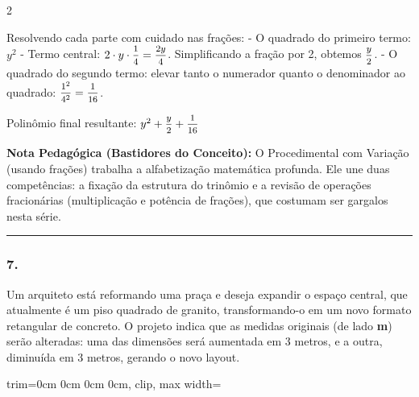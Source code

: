 \begin{multicols*}{2}
\begin{tcolorbox}[colback=CorTitUm!5, colframe=CorTitUm, boxrule=1pt, arc=4pt, left=6pt, right=6pt, top=6pt, bottom=6pt]
    Resolvendo cada parte com cuidado nas frações:
    - O quadrado do primeiro termo: $ y^2 $
    - Termo central: $ 2 \cdot y \cdot \mfrac{1}{4} = \mfrac{2y}{4} $. Simplificando a fração por 2, obtemos $ \mfrac{y}{2} $.
    - O quadrado do segundo termo: elevar tanto o numerador quanto o denominador ao quadrado: $ \mfrac{1^2}{4^2} = \mfrac{1}{16} $.
    
    Polinômio final resultante:
    $ y^2 + \mfrac{y}{2} + \mfrac{1}{16} $
    \end{tcolorbox}
    \vspace{0.15cm}
    
    \begin{boxexplicacao}
    \textbf{Nota Pedagógica (Bastidores do Conceito):} O Procedimental com Variação (usando frações) trabalha a alfabetização matemática profunda. Ele une duas competências: a fixação da estrutura do trinômio e a revisão de operações fracionárias (multiplicação e potência de frações), que costumam ser gargalos nesta série.
    \end{boxexplicacao}
\fi

\par\vspace{\espacoQuestao}

\noindent\textcolor{CorLinha}{\rule{\linewidth}{0.5pt}} 
\par\vspace{\espacoPreQuestao}
\subsubsection*{7.} 
\begin{enunciadoLiteral}
Um arquiteto está reformando uma praça e deseja expandir o espaço central, que atualmente é um piso quadrado de granito, transformando-o em um novo formato retangular de concreto. O projeto indica que as medidas originais (de lado \textbf{m}) serão alteradas: uma das dimensões será aumentada em 3 metros, e a outra, diminuída em 3 metros, gerando o novo layout.

\begin{center}
\begin{adjustbox}{trim=0cm 0cm 0cm 0cm, clip, max width=\larguraTikz}
\end{adjustbox}
\end{center}
\end{enunciadoLiteral}
\end{multicols*}
